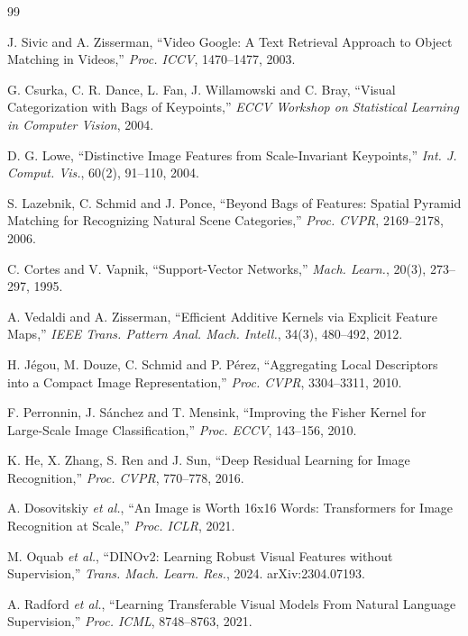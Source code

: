 \begin{thebibliography}{99}

 J. Sivic and A. Zisserman, ``Video Google: A Text Retrieval Approach to Object Matching in Videos,'' \textit{Proc. ICCV}, 1470--1477, 2003.

 G. Csurka, C. R. Dance, L. Fan, J. Willamowski and C. Bray, ``Visual Categorization with Bags of Keypoints,'' \textit{ECCV Workshop on Statistical Learning in Computer Vision}, 2004.

 D. G. Lowe, ``Distinctive Image Features from Scale-Invariant Keypoints,'' \textit{Int. J. Comput. Vis.}, 60(2), 91--110, 2004.

 S. Lazebnik, C. Schmid and J. Ponce, ``Beyond Bags of Features: Spatial Pyramid Matching for Recognizing Natural Scene Categories,'' \textit{Proc. CVPR}, 2169--2178, 2006.

 C. Cortes and V. Vapnik, ``Support-Vector Networks,'' \textit{Mach. Learn.}, 20(3), 273--297, 1995.

 A. Vedaldi and A. Zisserman, ``Efficient Additive Kernels via Explicit Feature Maps,'' \textit{IEEE Trans. Pattern Anal. Mach. Intell.}, 34(3), 480--492, 2012.

 H. J\'egou, M. Douze, C. Schmid and P. P\'erez, ``Aggregating Local Descriptors into a Compact Image Representation,'' \textit{Proc. CVPR}, 3304--3311, 2010.

 F. Perronnin, J. S\'anchez and T. Mensink, ``Improving the Fisher Kernel for Large-Scale Image Classification,'' \textit{Proc. ECCV}, 143--156, 2010.

 K. He, X. Zhang, S. Ren and J. Sun, ``Deep Residual Learning for Image Recognition,'' \textit{Proc. CVPR}, 770--778, 2016.

 A. Dosovitskiy \textit{et al.}, ``An Image is Worth 16x16 Words: Transformers for Image Recognition at Scale,'' \textit{Proc. ICLR}, 2021.

 M. Oquab \textit{et al.}, ``DINOv2: Learning Robust Visual Features without Supervision,'' \textit{Trans. Mach. Learn. Res.}, 2024. arXiv:2304.07193.

 A. Radford \textit{et al.}, ``Learning Transferable Visual Models From Natural Language Supervision,'' \textit{Proc. ICML}, 8748--8763, 2021.


\end{thebibliography}
